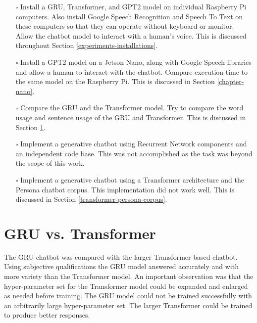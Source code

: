 \begin{itemize}
	\item[\rlap{\raisebox{0.3ex}{\hspace{0.4ex}\tiny \ding{52}}}$\square$] Install a GRU, Transformer, and GPT2 model on individual Raspberry Pi computers. Also install Google Speech Recognition and Speech To Text on these computers so that they can operate without keyboard or monitor. Allow the chatbot model to interact with a human's voice. This is discussed throughout Section \ref{experiments-installations}.
	
	\item[\rlap{\raisebox{0.3ex}{\hspace{0.4ex}\tiny \ding{52}}}$\square$] Install a GPT2 model on a Jetson Nano, along with Google Speech libraries and allow a human to interact with the chatbot. Compare execution time to the same model on the Raspberry Pi. This is discussed in Section \ref{chapter-nano}.
	
	\item[\rlap{\raisebox{0.3ex}{\hspace{0.4ex}\tiny \ding{52}}}$\square$] Compare the GRU and the Transformer model. Try to compare the word usage and sentence usage of the GRU and Transformer. This is discussed in Section \ref{gru-vs-transformer}.
	
	\item[\rlap{\raisebox{0.3ex}{\hspace{0.4ex}\scriptsize \ding{56}}}$\square$] Implement a generative chatbot using Recurrent Network components and an independent code base. This was not accomplished as the task was beyond the scope of this work.
	
	\item[\rlap{\raisebox{0.3ex}{\hspace{0.4ex}\scriptsize \ding{56}}}$\square$] Implement a generative chatbot using a Transformer architecture and the Persona chatbot corpus. This implementation did not work well. This is discussed in Section \ref{transformer-persona-corpus}. %
	

\end{itemize}
\fi

\section{GRU vs. Transformer}
\label{gru-vs-transformer}

The GRU chatbot was compared with the larger Transformer based chatbot. Using subjective qualifications the GRU model answered accurately and with more variety than the Transformer model. An important observation was that the hyper-parameter set for the Transformer model could be expanded and enlarged as needed before training. The GRU model could not be trained successfully with an arbitrarily large hyper-parameter set. The larger Transformer could be trained to produce better responses.

